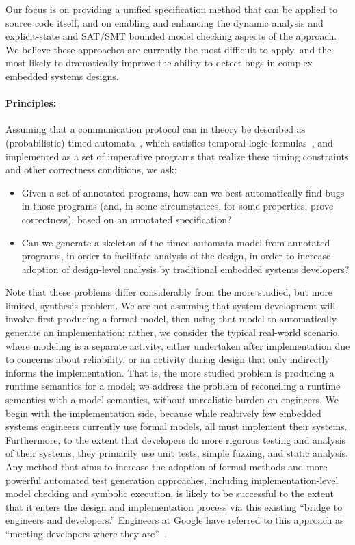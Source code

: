 Our focus is on providing a unified specification method that can be
applied to source code itself, and on enabling and enhancing the dynamic analysis and
explicit-state and SAT/SMT bounded model
checking aspects of the approach.  We believe these approaches are
currently the most difficult to apply, and the most likely to
dramatically improve the ability to detect bugs in complex embedded
systems designs.

\paragraph{Principles:} Assuming that a communication protocol can in theory be described
as (probabilistic) timed automata~\cite{AD1994:TCS},
which satisfies temporal logic
formulas~\cite{BLM2017:LNCS}, and implemented as a set of
imperative programs that realize these timing constraints and other
correctness conditions, we ask:
\begin{itemize}[labelsep=3pt,leftmargin=12pt]
\item Given a set of annotated programs, how can we best automatically
  find bugs in those programs (and, in some circumstances, for some
  properties, prove correctness), based on an annotated
  specification?
\item Can we generate a skeleton of the timed automata model from 
  annotated programs, in order to facilitate analysis of the design, 
  in order to increase adoption of design-level analysis by 
  traditional embedded systems developers? 
\end{itemize}

Note that these problems differ considerably from the more studied,
but more limited, synthesis problem.  We are not assuming that
system development will involve first producing a formal model, then
using that model to automatically generate an implementation; rather,
we consider the typical real-world scenario, where modeling is a
separate activity, either undertaken after implementation due to
concerns about reliability, or an activity during design that only
indirectly informs the implementation.  That is, the more studied
problem is producing a runtime semantics for a model; we address the
problem of reconciling a runtime semantics with a model semantics,
without unrealistic burden on engineers.  We begin with the
implementation side, because while realtively few embedded systems
engineers currently use formal models, all must implement their
systems.  Furthermore, to the extent that developers do more rigorous
testing and analysis of their systems, they primarily use unit tests, simple
fuzzing, and static analysis.  Any method that aims to increase the
adoption of formal methods and more powerful automated test generation
approaches, including implementation-level model checking and symbolic
execution, is likely to be successful to the extent that it enters the
design and implementation process via this existing ``bridge to
engineers and developers.''  Engineers at Google have referred to this
approach as ``meeting developers where they are''~\cite{meeting}.


